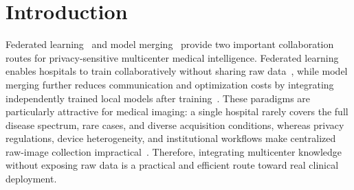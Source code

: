 \documentclass[letterpaper]{article} %
\begin{document}

\section{Introduction}

Federated learning~\cite{pmlr-v54-mcmahan17a,li2020fedprox,karimireddy2020scaffold,kairouz2021advances} and model merging~\cite{izmailov2018averaging,pmlr-v162-wortsman22a,ilharco2023editingmodelstaskarithmetic,yadav2023tiesmergingresolvinginterferencemerging} provide two important collaboration routes for privacy-sensitive multicenter medical intelligence. Federated learning enables hospitals to train collaboratively without sharing raw data~\cite{sheller2020federated,rieke2020future}, while model merging further reduces communication and optimization costs by integrating independently trained local models after training~\cite{ainsworth2023gitrebasinmergingmodels,stoica2024zipit,matena2022mergingmodelsfisherweightedaveraging}. These paradigms are particularly attractive for medical imaging: a single hospital rarely covers the full disease spectrum, rare cases, and diverse acquisition conditions, whereas privacy regulations, device heterogeneity, and institutional workflows make centralized raw-image collection impractical~\cite{kaissis2020secure,bonawitz2019towards,abadi2016deep}. Therefore, integrating multicenter knowledge without exposing raw data is a practical and efficient route toward real clinical deployment.
\end{document}
